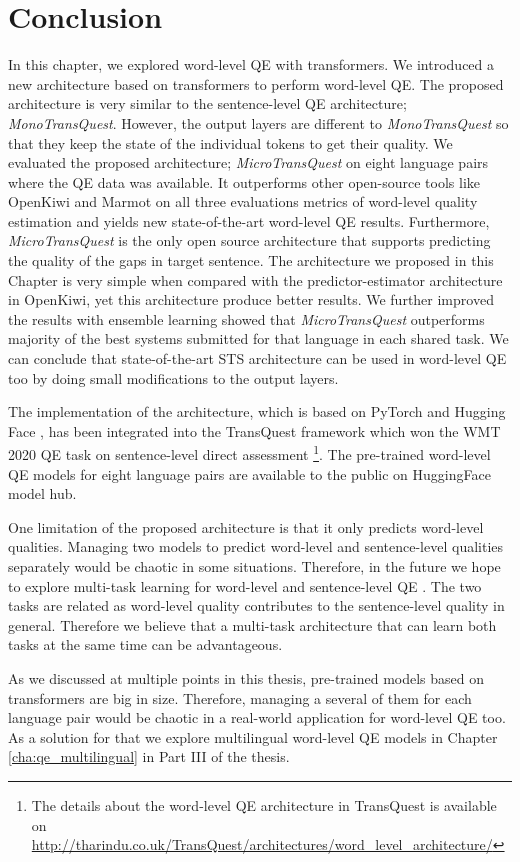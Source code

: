 \section{Conclusion}
In this chapter, we explored word-level QE with transformers. We introduced a new architecture based on transformers to perform word-level QE. The proposed architecture is very similar to the sentence-level QE architecture; \textit{MonoTransQuest}. However, the output layers are different to \textit{MonoTransQuest} so that they keep the state of the individual tokens to get their quality. We evaluated the proposed architecture; \textit{MicroTransQuest} on eight language pairs where the QE data was available.  It outperforms other open-source tools like OpenKiwi and Marmot on all three evaluations metrics of word-level quality estimation and yields new state-of-the-art word-level QE results. Furthermore, \textit{MicroTransQuest} is the only open source architecture that supports predicting the quality of the gaps in target sentence. The architecture we proposed in this Chapter is very simple when compared with the predictor-estimator architecture in OpenKiwi, yet this architecture produce better results. We further improved the results with ensemble learning showed that \textit{MicroTransQuest} outperforms majority of the best systems submitted for that language in each shared task. We can conclude that state-of-the-art STS architecture can be used in word-level QE too by doing small modifications to the output layers.

The implementation of the architecture, which is based on PyTorch \autocite{NEURIPS2019_9015} and Hugging Face \autocite{wolf-etal-2020-transformers}, has been integrated into the TransQuest framework \autocite{ranasinghe-etal-2020-transquest} which won the WMT 2020 QE task \autocite{specia-etal-2020-findings-wmt} on sentence-level direct assessment \autocite{ranasinghe-etal-2020-transquest-wmt2020}\footnote{The details about the word-level QE architecture in TransQuest is available on \url{http://tharindu.co.uk/TransQuest/architectures/word_level_architecture/}}. The pre-trained word-level QE models for eight language pairs are available to the public on HuggingFace model hub. 

One limitation of the proposed architecture is that it only predicts word-level qualities. Managing two models to predict word-level and sentence-level qualities separately would be chaotic in some situations. Therefore, in the future we hope to explore multi-task learning for word-level and sentence-level QE \autocite{Caruana1997}. The two tasks are related as word-level quality contributes to the sentence-level quality in general. Therefore we believe that a multi-task architecture that can learn both tasks at the same time can be advantageous. 

As we discussed at multiple points in this thesis, pre-trained models based on transformers are big in size. Therefore, managing a several of them for each language pair would be chaotic in a real-world application for word-level QE too. As a solution for that we explore multilingual word-level QE models in Chapter \ref{cha:qe_multilingual} in Part III of the thesis.



